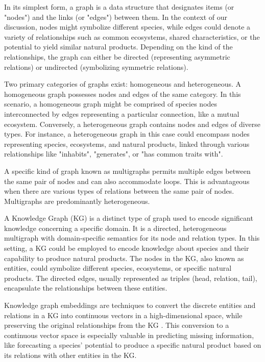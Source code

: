 \documentclass[
11pt, %
oneside, %
english, %
singlespacing, %
headsepline, %
chapterinoneline, %
]{MastersDoctoralThesis} %
\begin{document}
In its simplest form, a graph is a data structure that designates items (or "nodes") and the links (or "edges") between them. In the context of our discussion, nodes might symbolize different species, while edges could denote a variety of relationships such as common ecosystems, shared characteristics, or the potential to yield similar natural products. Depending on the kind of the relationships, the graph can either be directed (representing asymmetric relations) or undirected (symbolizing symmetric relations).

Two primary categories of graphs exist: homogeneous and heterogeneous. A homogeneous graph possesses nodes and edges of the same category. In this scenario, a homogeneous graph might be comprised of species nodes interconnected by edges representing a particular connection, like a mutual ecosystem. Conversely, a heterogeneous graph contains nodes and edges of diverse types. For instance, a heterogeneous graph in this case could encompass nodes representing species, ecosystems, and natural products, linked through various relationships like "inhabits", "generates", or "has common traits with".

A specific kind of graph known as multigraphs permits multiple edges between the same pair of nodes and can also accommodate loops. This is advantageous when there are various types of relations between the same pair of nodes. Multigraphs are predominantly heterogeneous.

A Knowledge Graph (KG) is a distinct type of graph used to encode significant knowledge concerning a specific domain. It is a directed, heterogeneous multigraph with domain-specific semantics for its node and relation types. In this setting, a KG could be employed to encode knowledge about species and their capability to produce natural products. The nodes in the KG, also known as entities, could symbolize different species, ecosystems, or specific natural products. The directed edges, usually represented as triples (head, relation, tail), encapsulate the relationships between these entities.

Knowledge graph embeddings are techniques to convert the discrete entities and relations in a KG into continuous vectors in a high-dimensional space, while preserving the original relationships from the KG \cite{wangKnowledgeGraphEmbedding2017}. This conversion to a continuous vector space is especially valuable in predicting missing information, like forecasting a species' potential to produce a specific natural product based on its relations with other entities in the KG.
\end{document}
